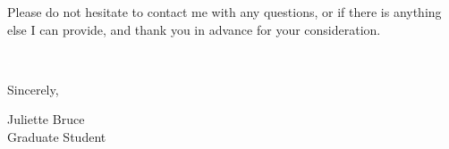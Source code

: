 \documentclass[11pt]{article}
\begin{document}
%
%
%

Please do not hesitate to contact me with any questions, or if there is anything else I can provide, and thank you in advance for your consideration. 

\vspace{24pt}
\noindent
\begin{minipage}{0.99\textwidth}
\begin{minipage}{0.69\textwidth}
\textcolor{white}{.}
\end{minipage}
\begin{minipage}{0.29\textwidth}
Sincerely, 

\vspace{36pt}
Juliette Bruce\\
Graduate Student
\end{minipage}
\end{minipage}

\end{document}
